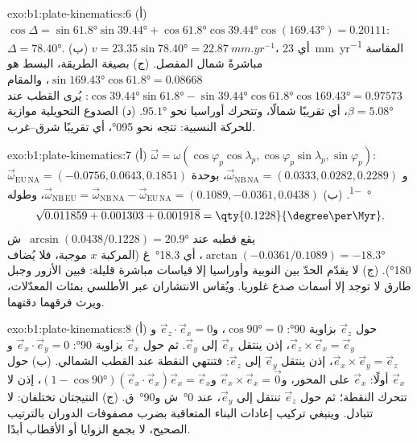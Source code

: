 \begin{solution}{exo:b1:plate-kinematics:6}
(أ) $\cos\Delta = \sin\ang{61.8}\sin\ang{39.44} + \cos\ang{61.8}\cos\ang{39.44}
\cos(\ang{169.43}) = 0.20111$: $\Delta = \ang{78.40}$. (ب) $v = 23.35
\sin\ang{78.40} = \qty{22.87}{mm.yr^{-1}}$، أي \qty{23}{mm.yr^{-1}} المقاسة
مباشرةً شمال المفصل. (ج) بصيغة الطريقة، البسط هو $\sin\ang{169.43}\cos\ang{61.8} = 0.08668$، والمقام
$\cos\ang{39.44}\sin\ang{61.8} - \sin\ang{39.44}\cos\ang{61.8}\cos\ang{169.43}
= 0.97573$: يُرى القطب عند $\beta = \ang{5.08}$، أي تقريبًا شمالًا، وتتحرك أوراسيا نحو $\ang{95.1}$. (د) الصدوع التحويلية موازية للحركة النسبية: تتجه نحو \ang{095}، أي تقريبًا شرق–غرب.
\end{solution}

\begin{solution}{exo:b1:plate-kinematics:7}
(أ) $\vec\omega = \omega(\cos\varphi_p\cos\lambda_p, \cos\varphi_p\sin\lambda_p,
\sin\varphi_p)$: $\vec\omega_{\mathrm{EU\,NA}} = (-0.0756, 0.0643, 0.1851)$ و
$\vec\omega_{\mathrm{NB\,NA}} = (0.0333, 0.0282, 0.2289)$، بوحدة
\unit{\degree\per\Myr}. (ب) $\vec\omega_{\mathrm{NB\,EU}} =
\vec\omega_{\mathrm{NB\,NA}} - \vec\omega_{\mathrm{EU\,NA}} = (0.1089, -0.0361,
0.0438)$، وطوله
\[
  \sqrt{0.011859 + 0.001303 + 0.001918} = \qty{0.1228}{\degree\per\Myr}.
\]
يقع قطبه عند  $\arcsin(0.0438/0.1228) = \ang{20.9}$~ش  $\arctan(-0.0361/0.1089) = \ang{-18.3}$، أي \ang{18.3}~غ (المركبة $x$ موجبة، فلا يُضاف \ang{180}). (ج) لا يقدّم الحدّ بين النوبية وأوراسيا إلا قياسات مباشرة قليلة: فبين الأزور وجبل طارق لا توجد إلا أسمات صدع غلوريا. ويُقاس الانتشاران عبر الأطلسي بمئات المعدّلات، ويرث فرقهما دقتهما.
\end{solution}

\begin{solution}{exo:b1:plate-kinematics:8}
(أ) حول $\vec e_z$ بزاوية \ang{90}: $\cos\ang{90} = 0$، و$\vec e_z\cdot\vec e_x = 0$
و$\vec e_z\times\vec e_x = \vec e_y$، إذن ينتقل $\vec e_x$ إلى $\vec e_y$. ثم حول $\vec e_x$ بزاوية \ang{90}: $\vec e_x\cdot\vec e_y = 0$ و
$\vec e_x\times\vec e_y = \vec e_z$، إذن ينتقل $\vec e_y$ إلى $\vec e_z$: فتنتهي النقطة عند القطب الشمالي. (ب) حول $\vec e_x$ أولًا: $\vec e_x$ على المحور، و$\vec e_x\times\vec e_x = \vec 0$ و$(1 - \cos\ang{90})(\vec e_x\cdot\vec e_x)
\vec e_x = \vec e_x$، إذن لا تتحرك النقطة؛ ثم حول $\vec e_z$ تنتقل إلى
$\vec e_y$، عند \ang{0}~ش و\ang{90}~ق. (ج) النتيجتان تختلفان:  لا تتبادل. وينبغي تركيب إعادات البناء المتعاقبة بضرب مصفوفات الدوران بالترتيب الصحيح، لا بجمع الزوايا أو الأقطاب أبدًا.
\end{solution}

